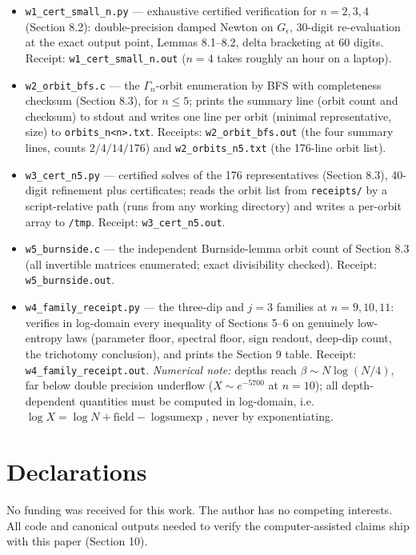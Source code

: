 \documentclass[11pt]{article}
\begin{document}
\begin{itemize}
\item \texttt{w1\_cert\_small\_n.py} — exhaustive certified verification for $n = 2, 3, 4$ (Section 8.2): double-precision damped Newton on $G_\epsilon$, 30-digit re-evaluation at the exact output point, Lemmas 8.1–8.2, delta bracketing at 60 digits.  Receipt: \texttt{w1\_cert\_small\_n.out} ($n=4$ takes roughly an hour on a laptop).
\item \texttt{w2\_orbit\_bfs.c} — the $\Gamma_n$-orbit enumeration by BFS with completeness checksum (Section 8.3), for $n \le 5$; prints the summary line (orbit count and checksum) to stdout and writes one line per orbit (minimal representative, size) to \texttt{orbits\_n<n>.txt}. Receipts: \texttt{w2\_orbit\_bfs.out} (the four summary lines, counts $2/4/14/176$) and \texttt{w2\_orbits\_n5.txt} (the 176-line orbit list).
\item \texttt{w3\_cert\_n5.py} — certified solves of the 176 representatives (Section 8.3), 40-digit refinement plus certificates; reads the orbit list from \texttt{receipts/} by a script-relative path (runs from any working directory) and writes a per-orbit array to \texttt{/tmp}.  Receipt: \texttt{w3\_cert\_n5.out}.
\item \texttt{w5\_burnside.c} — the independent Burnside-lemma orbit count of Section 8.3 (all invertible matrices enumerated; exact divisibility checked).  Receipt: \texttt{w5\_burnside.out}.
\item \texttt{w4\_family\_receipt.py} — the three-dip and $j{=}3$ families at $n = 9, 10, 11$: verifies in log-domain every inequality of Sections 5–6 on genuinely low-entropy laws (parameter floor, spectral floor, sign readout, deep-dip count, the trichotomy conclusion), and prints the Section 9 table.  Receipt: \texttt{w4\_family\_receipt.out}.  \emph{Numerical note:} depths reach $\beta \sim N\log(N/4)$, far below double precision underflow ($X \sim e^{-5700}$ at $n=10$); all depth-dependent quantities must be computed in log-domain, i.e. $\log X = \log N + \text{field} - \operatorname{logsumexp}$, never by exponentiating.
\end{itemize}
\section*{Declarations}
No funding was received for this work.  The author has no competing interests.  All code and canonical outputs needed to verify the computer-assisted claims ship with this paper (Section 10).
\end{document}
